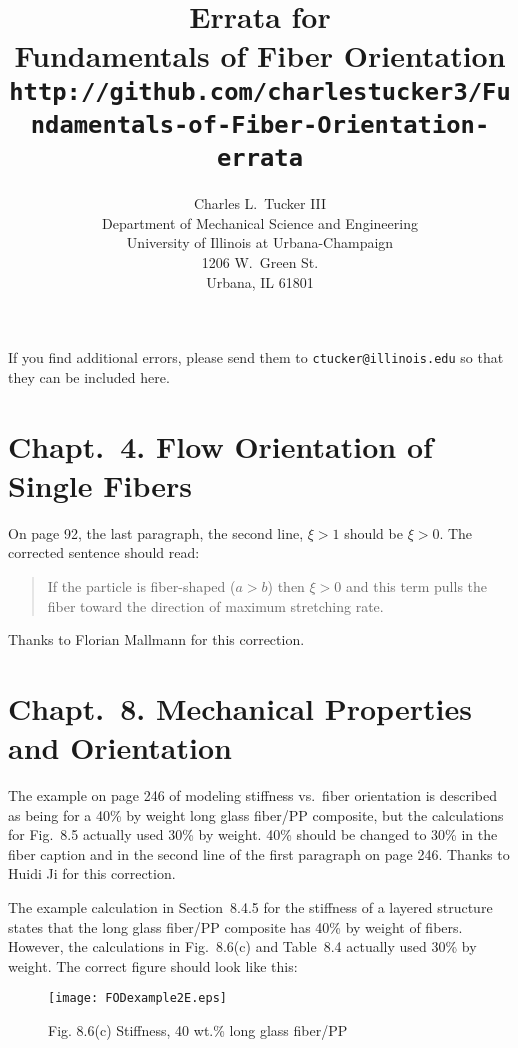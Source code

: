 \documentclass[11pt]{article}
\title{Errata for \\
      \textbf{Fundamentals of Fiber Orientation} \\
      { \normalsize \texttt{http://github.com/charlestucker3/Fundamentals-of-Fiber-Orientation-errata}} }
\author{Charles L.~Tucker III \\
       Department of Mechanical Science and Engineering \\
        University of Illinois at Urbana-Champaign \\
        1206 W.~Green St. \\
        Urbana, IL 61801 \\
        }
\begin{document}
\maketitle

If you find additional errors, please send them to \texttt{ctucker@illinois.edu} so that they can be included here.

\section*{Chapt.\ 4. Flow Orientation of Single Fibers}

On page 92, the last paragraph, the second line, $\xi > 1$ should be $\xi > 0$.  The corrected sentence should read:
\begin{quote}
If the particle is fiber-shaped ($a > b$) then $\xi > 0$ and this term pulls the fiber toward the direction of maximum stretching rate.
\end{quote}
Thanks to Florian Mallmann for this correction.

\section*{Chapt.\ 8. Mechanical Properties and Orientation}

The example on page 246 of modeling stiffness vs.~fiber orientation is described as being for a 40\% by weight long glass fiber/PP composite, but the calculations for Fig.~8.5 actually used 30\% by weight.  40\% should be changed to 30\% in the fiber caption and in the second line of the first paragraph on page 246.  Thanks to Huidi Ji for this correction.

The example calculation in Section~8.4.5 for the stiffness of a layered structure states that the long glass fiber/PP composite has 40\% by weight of fibers.  However, the calculations in Fig.~8.6(c) and Table~8.4 actually used 30\% by weight.  The correct figure should look like this:
\begin{figure*}[h]
   \centering
    \texttt{[image: FODexample2E.eps]} \\
    \caption*{Fig. 8.6(c) Stiffness, 40 wt.\% long glass fiber/PP}
\end{figure*}
\end{document}
